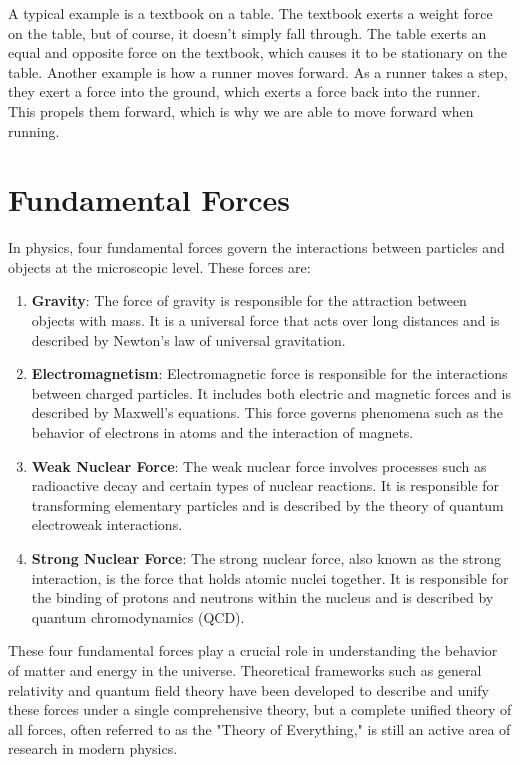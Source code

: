 \documentclass[11pt]{article}
\begin{document}
A typical example is a textbook on a table. The textbook exerts a weight force on the table, but of course, it doesn't simply fall through. The table exerts an equal and opposite force on the textbook, which causes it to be stationary on the table. Another example is how a runner moves forward. As a runner takes a step, they exert a force into the ground, which exerts a force back into the runner. This propels them forward, which is why we are able to move forward when running.

\section{Fundamental Forces}

In physics, four fundamental forces govern the interactions between particles and objects at the microscopic level. These forces are:

\begin{enumerate}
\item \textbf{Gravity}: The force of gravity is responsible for the attraction between objects with mass. It is a universal force that acts over long distances and is described by Newton's law of universal gravitation.

\item \textbf{Electromagnetism}: Electromagnetic force is responsible for the interactions between charged particles. It includes both electric and magnetic forces and is described by Maxwell's equations. This force governs phenomena such as the behavior of electrons in atoms and the interaction of magnets.

\item \textbf{Weak Nuclear Force}: The weak nuclear force involves processes such as radioactive decay and certain types of nuclear reactions. It is responsible for transforming elementary particles and is described by the theory of quantum electroweak interactions.

\item \textbf{Strong Nuclear Force}: The strong nuclear force, also known as the strong interaction, is the force that holds atomic nuclei together. It is responsible for the binding of protons and neutrons within the nucleus and is described by quantum chromodynamics (QCD).

\end{enumerate}

These four fundamental forces play a crucial role in understanding the behavior of matter and energy in the universe. Theoretical frameworks such as general relativity and quantum field theory have been developed to describe and unify these forces under a single comprehensive theory, but a complete unified theory of all forces, often referred to as the "Theory of Everything," is still an active area of research in modern physics.
\end{document}
